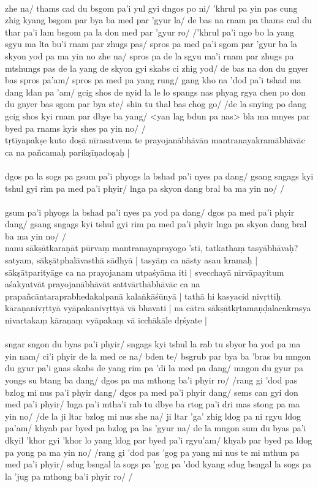 \documentclass[12pt]{article}
\begin{document}
\textbf{\TVB}\\
zhe na/ thams cad du bsgom pa'i yul gyi dngos po ni/ 'khrul pa yin pas cung zhig kyang bsgom par bya ba med par 'gyur la/ de bas na rnam pa thams cad du thar pa'i lam bsgom pa la don med par 'gyur ro/ /'khrul pa'i ngo bo la yang sgyu ma lta bu'i rnam par zhugs pas/ spros pa med pa'i sgom par 'gyur ba la skyon yod pa ma yin no zhe na/ spros pa de la sgyu ma'i rnam par zhugs pa mtshungs pas de la yang de skyon gyi skabs ci zhig yod/ de bas na don du gnyer bas spros pa'am/ spros pa med pa yang rung/ gang kho na 'dod pa'i tshad ma dang ldan pa 'am/ gcig shos de nyid la le lo spangs nas phyag rgya chen po don du gnyer bas sgom par bya ste/ shin tu thal bas chog go/ /de la snying po dang gcig shos kyi rnam par dbye ba yang/ <yan lag bdun pa nas> bla ma mnyes par byed pa rnams kyis shes pa yin no/ /\\

tṛtīyapakṣe kuto doṣā nīrasatvena te prayojanābhāvān mantranayakramābhāvāc ca na pañcamaḥ parikṣīṇadoṣaḥ |\\

\textbf{\TVA}\\
dgos pa la sogs pa gsum pa'i phyogs la bshad pa'i nyes pa dang/ gsang sngags kyi tshul gyi rim pa med pa'i phyir/ lnga pa skyon dang bral ba ma yin no/ /\\

\textbf{\TVB}\\
gsum pa'i phyogs la bshad pa'i nyes pa yod pa dang/ dgos pa med pa'i phyir dang/ gsang sngags kyi tshul gyi rim pa med pa'i phyir lnga pa skyon dang bral ba ma yin no/ /\\

nanu sākṣātkaraṇāt pūrvaṃ mantranayaprayogo 'sti, tatkathaṃ tasyābhāvaḥ? satyam, sākṣātphalāvasthā sādhyā | tasyāṃ ca nāsty asau kramaḥ | sākṣātparityāge ca na prayojanam utpaśyāma iti | svecchayā nirvāpayitum aśakyatvāt prayojanābhāvāt sattvārthābhāvāc ca na prapañcāntaraprabhedakalpanā kalaṅkāśūnyā | tathā hi kasyacid nivṛttiḥ kāraṇanivṛttyā vyāpakanivṛttyā vā bhavati | na cātra sākṣātkṛtamaṇḍalacakrasya nivartakaṃ kāraṇaṃ vyāpakaṃ vā icchākāle dṛśyate |\\

\textbf{\TVA}\\
sngar sngon du byas pa'i phyir/ sngags kyi tshul la rab tu sbyor ba yod pa ma yin nam/ ci'i phyir de la med ce na/ bden te/ bsgrub par bya ba 'bras bu mngon du gyur pa'i gnas skabs de yang rim pa 'di la med pa dang/ mngon du gyur pa yongs su btang ba dang/ dgos pa ma mthong ba'i phyir ro/ /rang gi 'dod pas bzlog mi nus pa'i phyir dang/ dgos pa med pa'i phyir dang/ sems can gyi don med pa'i phyir/ lnga pa'i mtha'i rab tu dbye ba rtog pa'i dri mas stong pa ma yin no/ /de la ji ltar bzlog mi nus she na/ ji ltar 'ga' zhig ldog pa ni rgyu ldog pa'am/ khyab par byed pa bzlog pa las 'gyur na/ de la mngon sum du byas pa'i dkyil 'khor gyi 'khor lo yang ldog par byed pa'i rgyu'am/ khyab par byed pa ldog pa yong pa ma yin no/ /rang gi 'dod pas 'gog pa yang mi nus te mi mthun pa med pa'i phyir/ sdug bsngal la sogs pa 'gog pa 'dod kyang sdug bsngal la sogs pa la 'jug pa mthong ba'i phyir ro/ /\\
\end{document}
